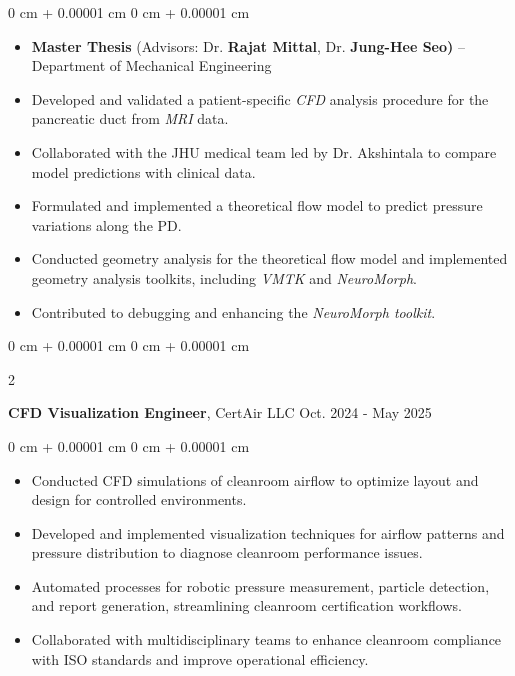 \documentclass[10pt, letterpaper]{article}
\newenvironment{highlights}{
    \begin{itemize}[
        topsep=0.10 cm,
        parsep=0.10 cm,
        partopsep=0pt,
        itemsep=0pt,
        leftmargin=0 cm + 10pt
    ]
}{
    \end{itemize}
} %
\newenvironment{onecolentry}{
    \begin{adjustwidth}{
        0 cm + 0.00001 cm
    }{
        0 cm + 0.00001 cm
    }
}{
    \end{adjustwidth}
} %
\newenvironment{twocolentry}[2][]{
    \onecolentry
    \def\secondColumn{#2}
    \setcolumnwidth{\fill, 4.5 cm}
    \begin{paracol}{2}
}{ 
    \switchcolumn \raggedleft \secondColumn
    \end{paracol}
    \endonecolentry
} %
\begin{document}
        \vspace{0.10 cm}
        \begin{onecolentry}
            \begin{highlights}
                \item \textbf{Master Thesis} (Advisors: Dr. \textbf{Rajat Mittal}, Dr. \textbf{Jung-Hee Seo)} – Department of Mechanical Engineering
                \item Developed and validated a patient-specific \textit{CFD} analysis procedure for the pancreatic duct from \textit{MRI} data.
                \item Collaborated with the JHU medical team led by Dr. Akshintala to compare model predictions with clinical data.
                \item Formulated and implemented a theoretical flow model to predict pressure variations along the PD.
                \item Conducted geometry analysis for the theoretical flow model and implemented geometry analysis toolkits, including \textit{VMTK} and \textit{NeuroMorph}.
                \item Contributed to debugging and enhancing the \textit{NeuroMorph toolkit}.
            \end{highlights}
        \end{onecolentry}

        \begin{twocolentry}{
            Oct. 2024 - May 2025
        }
            \textbf{CFD Visualization Engineer}, CertAir LLC\end{twocolentry}

        \vspace{0.10 cm}
        \begin{onecolentry}
            \begin{highlights}
                \item Conducted CFD simulations of cleanroom airflow to optimize layout and design for controlled environments.
                \item Developed and implemented visualization techniques for airflow patterns and pressure distribution to diagnose cleanroom performance issues.
                \item Automated processes for robotic pressure measurement, particle detection, and report generation, streamlining cleanroom certification workflows.
                \item Collaborated with multidisciplinary teams to enhance cleanroom compliance with ISO standards and improve operational efficiency.
            \end{highlights}
        \end{onecolentry}
\end{document}
